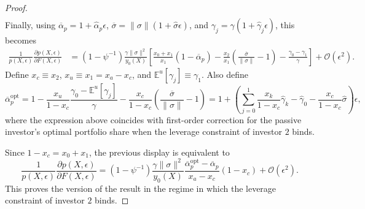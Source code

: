 \begin{proof}
\begin{align}
\end{align}
Finally, using $\overline{\alpha}_p=1+\hat{\alpha}_p\epsilon$, $\overline{\sigma}=\|\sigma\|(1+\hat{\sigma}\epsilon)$, and $\gamma_j=\gamma(1+\hat{\gamma}_j\epsilon)$, this becomes
\begin{align}
    \frac{1}{p(X,\epsilon)}\frac{\partial p(X,\epsilon)}{\partial F(X,\epsilon)}
    &= (1-\psi^{-1})\frac{\gamma\|\sigma\|^2}{y_0(X)}
    \left[
        \frac{x_0+x_1}{x_1}(1-\overline{\alpha}_p)
        -\frac{x_2}{x_1}\left(\frac{\overline{\sigma}}{\|\sigma\|}-1\right)
        -\frac{\gamma_0-\gamma_1}{\gamma}
    \right]
    +\mathcal{O}(\epsilon^2).
\end{align}
Define $x_c\equiv x_2$, $x_u\equiv x_1=x_a-x_c$, and $\mathbb{E}^u[\gamma_j]\equiv\gamma_1$.
Also define
\begin{equation}
    \overline{\alpha}_{p}^{\mathrm{opt}}
    = 1
    - \frac{x_u}{1-x_c}\frac{\gamma_0-\mathbb{E}^{u}[\gamma_j]}{\gamma}
    - \frac{x_c}{1-x_c}\left(\frac{\overline{\sigma}}{\|\sigma\|}-1\right) = 1 + \left( \sum_{j=0}^1 \frac{x_k}{1-x_c} \hat{\gamma}_k  - \hat{\gamma}_0 - \frac{x_c}{1-x_c} \hat{\sigma} \right) \epsilon,
\end{equation}
where the expression above coincides with first-order correction for the passive investor's optimal portfolio share when the leverage constraint of investor $2$ binds.

Since $1-x_c=x_0+x_1$, the previous display is equivalent to
\begin{equation}
    \frac{1}{p(X,\epsilon)}\frac{\partial p(X,\epsilon)}{\partial F(X,\epsilon)}
    = (1-\psi^{-1})\frac{\gamma\|\sigma\|^2}{y_0(X)}
    \frac{\overline{\alpha}_{p}^{\mathrm{opt}}-\overline{\alpha}_{p}}{x_a-x_c}
    (1-x_c)
    +\mathcal{O}(\epsilon^2).
\end{equation}
This proves the version of the result in the regime in which the leverage constraint of investor $2$ binds.


\end{proof}
	
